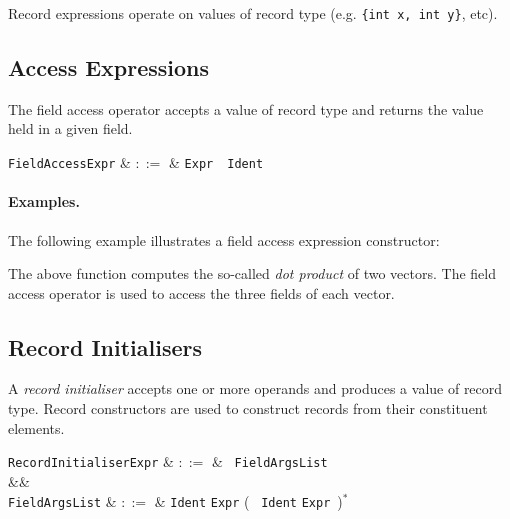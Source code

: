 Record expressions operate on values of record type (e.g. \lstinline|{int x, int y}|, etc).


\subsection{Access Expressions}
\label{c_expr_access}

The field access operator accepts a value of record type and returns the value held in a given field.

\begin{syntax}
  \verb+FieldAccessExpr+ & $::=$ & \verb+Expr+\ \ \verb+Ident+\\
\end{syntax}

\paragraph{Examples.}  The following example illustrates a field access expression constructor:



The above function computes the so-called {\em dot product} of two vectors.  The field access operator is used to access the three fields of each vector. 


\subsection{Record Initialisers}
\label{c_expr_record_initialiser}
A {\em record initialiser} accepts one or more operands and produces a value of record type.  Record constructors are used to construct records from their constituent elements.  

\begin{syntax}
  \verb+RecordInitialiserExpr+ & $::=$ & \token{\{}\ \verb+FieldArgsList+\ \token{\}}\\
&&\\
  \verb+FieldArgsList+ & $::=$ & \verb+Ident+ \token{:} \verb+Expr+ \big(\ \token{,} \verb+Ident+ \token{:} \verb+Expr+\ \big)$^*$\\
\end{syntax}

